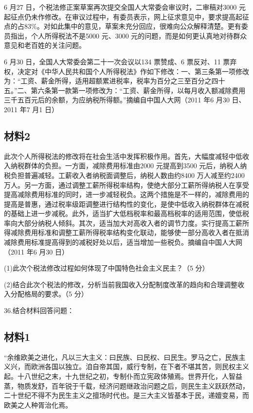 \documentclass[UTF8,11pt]{ctexart}
\begin{document}
6 月27 日，个税法修正案草案再次提交全国人大常委会审议时，二审稿对3000 元起征点仍未作修改。在审议过程中，有委员表示，网上征求意见中，要求提高起征点的占83\%。对如此集中的意见，草案未充分回应，很难向公众解释清楚。更有委员指出，个人所得税法不是5000 元、3000 元的问题，而是如何更认真地对待群众意见和老百姓的关注问题。

6 月30 日，全国人大常委会第二十一次会议以134 票赞成、6 票反对、11 票弃权，决定对《中华人民共和国个人所得税法》作如下修改：一、第三条第一项修改为：“工资、薪金所得，适用超额累进税率，税率为百分之三至百分之四十五。”二、第六条第一款第一项修改为：“工资、薪金所得，以每月收入额减除费用三千五百元后的余额，为应纳税所得额。”摘编自中国人大网（2011 年6 月30 日、2011 年7 月1 日）

\subsection*{材料2}

此次个人所得税法的修改将在社会生活中发挥积极作用。首先，大幅度减轻中低收入纳税群体的负担。一方面，减除费用标准由2000 元提高到3500 元后，纳税人纳税负担普遍减轻。工薪收入者纳税面调整后，纳税人数由约8400 万人减至约2400 万人。另一方面，通过调整工薪所得税率结构，使绝大部分工薪所得纳税人在享受提高减除费用标准的同时，进一步减轻税负。这两个措施是不一样的，减除费用的提高是普惠，通过税率级距调整进行结构性的变化，是使中低收入纳税群体在减税的基础上进一步减税。此外，适当扩大低档税率和最高档税率的适用范围，使低税率向大部分纳税人倾斜。其次，适当加大对高收入者的调节力度。实行提高工薪所得减除费用标准和调整工薪所得税率结构变化联动，能够使一部分高收入者在抵消减除费用标准提高得到的减税好处以后，适当增加一些税负。摘编自中国人大网（2011 年6 月30 日）


(1)此次个税法修改过程如何体现了中国特色社会主义民主？（5 分）


(2)结合此次个税法的修改，分析当前我国收入分配制度改革的趋向和合理调整收入分配格局的要求。（5 分）


36.结合材料回答问题：


\subsection*{材料1}

“余维欧美之进化，凡以三大主义：曰民族、曰民权、曰民生。罗马之亡，民族主义兴，而欧洲各国以独立。洎自帝其国，威行专制，在下者不堪其苦，则民权主义起。十八世纪之末，十九世纪之初，专制仆而立宪政体殖焉。世界开化，人智益蒸，物质发舒，百年锐于千载，经济问题继政治问题之后，则民生主义跃跃然动，二十世纪不得不为民生主义之擅场时代也。是三大主义皆基本于民，递嬗变易，而欧美之人种胥治化焉。
\end{document}
